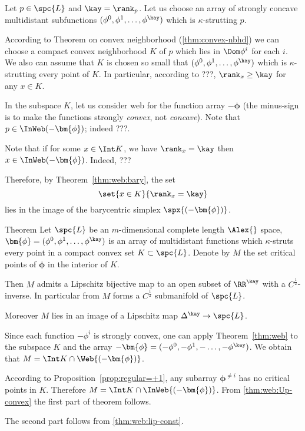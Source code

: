 Let $p\in\spc{L}$ and $\kay=\rank_p$.
Let us choose an array of strongly concave multidistant subfunctions $(\phi^0,\phi^1,\dots,\phi^\kay)$ which is $\kappa$-strutting $p$.

According to Theorem on convex neighborhood (\ref{thm:convex-nbhd}) we can choose a compact convex neighborhood $K$ of $p$
which lies in $\Dom\phi^i$ for each $i$.
We also can assume that $K$ is chosen so small that $(\phi^0,\phi^1,\dots,\phi^\kay)$ which is $\kappa$-strutting every point of $K$.
In particular, according to ???, $\rank_x\ge \kay$ for any $x\in K$. 

In the subspace $K$, 
let us consider web for the function array
$-\bm{\phi}$ (the minus-sign is to make the functions strongly \emph{convex}, not \emph{concave}).
Note that $p\in\InWeb(-\bm{\phi})$;
indeed ???.

Note that if for some $x\in\Int K$, 
we have $\rank_x=\kay$ 
then $x\in\InWeb (-\bm{\phi})$.
Indeed, ???

Therefore, by Theorem~\ref{thm:web:bary},
the set 
$$\set{x\in K}{\rank_x=\kay}$$
lies in the image of the barycentric simplex $\spx{(-\bm{\phi})}$.

\begin{thm}{Theorem}
Let $\spc{L}$ be an $m$-dimensional complete length $\Alex{}$ space,
$\bm{\phi}=(\phi^0,\phi^1,\dots,\phi^\kay)$ 
is an array of multidistant functions which 
$\kappa$-struts every point in a compact convex set $K\subset  \spc{L}$.
Denote by $M$ the set critical points of $\bm{\phi}$ in the interior of $K$.

Then $M$
admits a Lipschitz bijective map to an open subset of $\RR^\kay$ with a $C^{\frac12}$-inverse.
In particular from $M$ forms a $C^{\frac12}$ submanifold of $\spc{L}$.

Moreover $M$ lies in an image of a Lipschitz map $\Delta^\kay\to \spc{L}$.
\end{thm}

Since each function $-\phi^i$ is strongly convex,
one can apply Theorem~\ref{thm:web} to the
subspace $K$
and the array $-\bm{\phi}=(-\phi^0,-\phi^1,-\dots,-\phi^\kay)$.
We obtain that $M=\Int K\cap \Web{(-\bm{\phi})}$.

According to Proposition~\ref{prop:regular=+1}, 
any subarray $\bm{\phi}^{\ne i}$
has no critical points in $K$.
Therefore $M=\Int K\cap\InWeb{(-\bm{\phi})}$.
From \ref{thm:web:Up-convex} the first part of theorem follows.

The second part follows from \ref{thm:web:lip-const}.
\qeds


